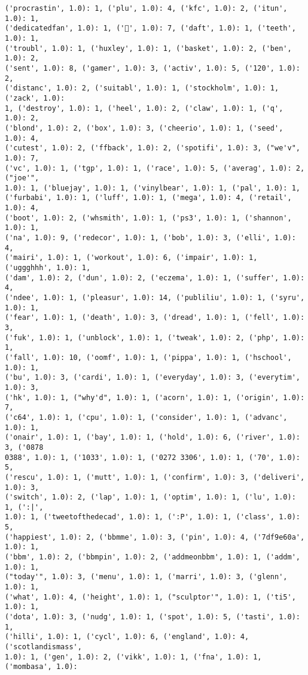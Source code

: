 \documentclass[11pt]{article}
\begin{document}
\begin{Verbatim}[commandchars=\\\{\}]
('procrastin', 1.0): 1, ('plu', 1.0): 4, ('kfc', 1.0): 2, ('itun', 1.0): 1,
('dedicatedfan', 1.0): 1, ('💜', 1.0): 7, ('daft', 1.0): 1, ('teeth', 1.0): 1,
('troubl', 1.0): 1, ('huxley', 1.0): 1, ('basket', 1.0): 2, ('ben', 1.0): 2,
('sent', 1.0): 8, ('gamer', 1.0): 3, ('activ', 1.0): 5, ('120', 1.0): 2,
('distanc', 1.0): 2, ('suitabl', 1.0): 1, ('stockholm', 1.0): 1, ('zack', 1.0):
1, ('destroy', 1.0): 1, ('heel', 1.0): 2, ('claw', 1.0): 1, ('q', 1.0): 2,
('blond', 1.0): 2, ('box', 1.0): 3, ('cheerio', 1.0): 1, ('seed', 1.0): 4,
('cutest', 1.0): 2, ('ffback', 1.0): 2, ('spotifi', 1.0): 3, ("we'v", 1.0): 7,
('vc', 1.0): 1, ('tgp', 1.0): 1, ('race', 1.0): 5, ('averag', 1.0): 2, ("joe'",
1.0): 1, ('bluejay', 1.0): 1, ('vinylbear', 1.0): 1, ('pal', 1.0): 1,
('furbabi', 1.0): 1, ('luff', 1.0): 1, ('mega', 1.0): 4, ('retail', 1.0): 4,
('boot', 1.0): 2, ('whsmith', 1.0): 1, ('ps3', 1.0): 1, ('shannon', 1.0): 1,
('na', 1.0): 9, ('redecor', 1.0): 1, ('bob', 1.0): 3, ('elli', 1.0): 4,
('mairi', 1.0): 1, ('workout', 1.0): 6, ('impair', 1.0): 1, ('uggghhh', 1.0): 1,
('dam', 1.0): 2, ('dun', 1.0): 2, ('eczema', 1.0): 1, ('suffer', 1.0): 4,
('ndee', 1.0): 1, ('pleasur', 1.0): 14, ('publiliu', 1.0): 1, ('syru', 1.0): 1,
('fear', 1.0): 1, ('death', 1.0): 3, ('dread', 1.0): 1, ('fell', 1.0): 3,
('fuk', 1.0): 1, ('unblock', 1.0): 1, ('tweak', 1.0): 2, ('php', 1.0): 1,
('fall', 1.0): 10, ('oomf', 1.0): 1, ('pippa', 1.0): 1, ('hschool', 1.0): 1,
('bu', 1.0): 3, ('cardi', 1.0): 1, ('everyday', 1.0): 3, ('everytim', 1.0): 3,
('hk', 1.0): 1, ("why'd", 1.0): 1, ('acorn', 1.0): 1, ('origin', 1.0): 7,
('c64', 1.0): 1, ('cpu', 1.0): 1, ('consider', 1.0): 1, ('advanc', 1.0): 1,
('onair', 1.0): 1, ('bay', 1.0): 1, ('hold', 1.0): 6, ('river', 1.0): 3, ('0878
0388', 1.0): 1, ('1033', 1.0): 1, ('0272 3306', 1.0): 1, ('70', 1.0): 5,
('rescu', 1.0): 1, ('mutt', 1.0): 1, ('confirm', 1.0): 3, ('deliveri', 1.0): 3,
('switch', 1.0): 2, ('lap', 1.0): 1, ('optim', 1.0): 1, ('lu', 1.0): 1, (':|',
1.0): 1, ('tweetofthedecad', 1.0): 1, (':P', 1.0): 1, ('class', 1.0): 5,
('happiest', 1.0): 2, ('bbmme', 1.0): 3, ('pin', 1.0): 4, ('7df9e60a', 1.0): 1,
('bbm', 1.0): 2, ('bbmpin', 1.0): 2, ('addmeonbbm', 1.0): 1, ('addm', 1.0): 1,
("today'", 1.0): 3, ('menu', 1.0): 1, ('marri', 1.0): 3, ('glenn', 1.0): 1,
('what', 1.0): 4, ('height', 1.0): 1, ("sculptor'", 1.0): 1, ('ti5', 1.0): 1,
('dota', 1.0): 3, ('nudg', 1.0): 1, ('spot', 1.0): 5, ('tasti', 1.0): 1,
('hilli', 1.0): 1, ('cycl', 1.0): 6, ('england', 1.0): 4, ('scotlandismass',
1.0): 1, ('gen', 1.0): 2, ('vikk', 1.0): 1, ('fna', 1.0): 1, ('mombasa', 1.0):

\end{Verbatim}
\end{document}
